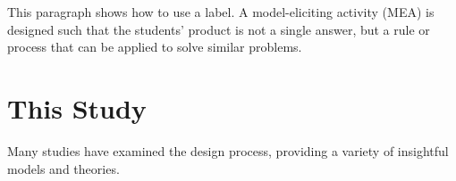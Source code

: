 This paragraph shows how to use a label. A model-eliciting activity (MEA) is \label{sec:MEA}
designed such that the students' product is not a single
answer, but a rule or process that can be applied to solve similar
problems.

\section{This Study}
Many studies have examined the design process, providing a variety of insightful models and theories. 
